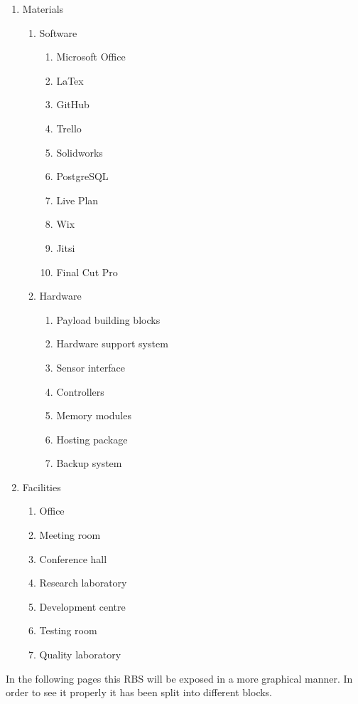\begin{enumerate}[label*=\arabic*.]
	\item Materials
		\begin{enumerate}[label*=\arabic*.]
			\item Software
			\begin{enumerate}[label*=\arabic*.]
				\item Microsoft Office
				\item LaTex
				\item GitHub
				\item Trello
				\item Solidworks
				\item PostgreSQL
				\item Live Plan
				\item Wix
				\item Jitsi
				\item Final Cut Pro
			\end{enumerate}
			\item Hardware
			\begin{enumerate}[label*=\arabic*.]
				\item Payload building blocks
				\item Hardware support system
				\item Sensor interface
				\item Controllers
				\item Memory modules
				\item Hosting package
				\item Backup system
			\end{enumerate}
		\end{enumerate}
	
	\item Facilities
		\begin{enumerate}[label*=\arabic*.]
		\item Office
		\item Meeting room
		\item Conference hall
		\item Research laboratory
		\item Development centre
		\item Testing room
		\item Quality laboratory
		\end{enumerate}
	
\end{enumerate}

In the following pages this RBS will be exposed in a more graphical manner. In order to see it properly it has been split into different blocks. \\
\vspace{10mm}

